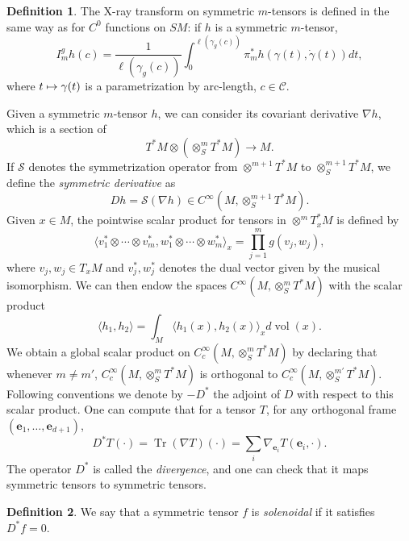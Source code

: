 \documentclass[10pt]{amsart}
\newcommand\mto{\mathchoice{\longmapsto}{\mapsto}{\mapsto}{\mapsto}}
\newcommand{\bse}{\boldsymbol{e}}
\newcommand{\mc}{\mathcal}
\DeclareMathOperator{\vol}{\mathrm{vol}}
\DeclareMathOperator{\Tr}{Tr}
\theoremstyle{plain}
\theoremstyle{definition}
\newtheorem{definition}{Definition}[section]
\begin{document}
\begin{definition}
\label{definition:xray}
The X-ray transform on symmetric $m$-tensors is defined in the same way as for $C^0$ functions on $SM$: if $h$ is a symmetric $m$-tensor,
\[
I_m^g h(c) = \frac{1}{\ell(\gamma_g(c))} \int_{0}^{\ell(\gamma_g(c))} \pi_m^\ast h(\gamma(t),\dot{\gamma}(t)) dt,
\]
where $t \mto \gamma(t)$ is a parametrization by arc-length, $c \in \mc{C}$.
\end{definition}

Given a symmetric $m$-tensor $h$, we can consider its covariant derivative $\nabla h$, which is a section of
\[
T^\ast M \otimes (\otimes^m_S T^\ast M) \to M.
\]
If $\mc{S}$ denotes the symmetrization operator from $\otimes^{m+1} T^\ast M$ to $\otimes^{m+1}_S T^\ast M$, we define the \emph{symmetric derivative} as
\[
D h = \mc{S} (\nabla h) \in C^\infty( M, \otimes^{m+1}_S T^\ast M).
\]
Given $x \in M$, the pointwise scalar product for tensors in $\otimes^m T^\ast_xM$ is defined by
\[
\langle v_1^* \otimes \cdots \otimes v_m^*, w_1^* \otimes \cdots \otimes w_m^* \rangle_x = \prod_{j=1}^m g(v_j,w_j),
\]
where $v_j, w_j \in T_xM$ and $v_j^*,w_j^*$ denotes the dual vector given by the musical isomorphism. We can then endow the spaces $C^\infty(M, \otimes^m_S T^\ast M)$ with the scalar product
\begin{equation}
\label{equation:metric-tensors}
\langle h_1, h_2 \rangle = \int_{M} \langle h_1(x), h_2(x) \rangle_x d\vol(x).
\end{equation}
We obtain a global scalar product on $C^\infty_c(M, \otimes^m_S T^\ast M)$ by declaring that whenever $m\neq m'$, $C^\infty_c(M, \otimes^m_ST^\ast M)$ is orthogonal to $C^\infty_c(M, \otimes^{m'}_ST^\ast M)$. Following conventions we denote by $-D^\ast$ the adjoint of $D$ with respect to this scalar product. One can compute that for a tensor $T$, for any orthogonal frame $(\bse_1,\dots,\bse_{d+1})$,
\[
D^\ast T(\cdot) = \Tr (\nabla T)(\cdot) = \sum_i \nabla_{\bse_i} T(\bse_i, \cdot).
\]
The operator $D^\ast$ is called the \emph{divergence}, and one can check that it maps symmetric tensors to symmetric tensors.

\begin{definition}\label{def:solenoidal}
We say that a symmetric tensor $f$ is \emph{solenoidal} if it satisfies \hbox{$D^*f=0$}.
\end{definition}
\end{document}

